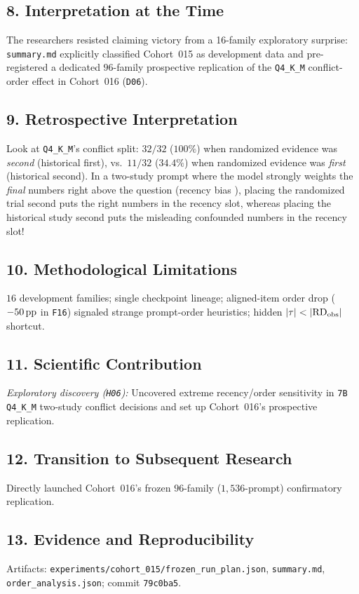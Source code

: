 \subsection*{8. Interpretation at the Time}
The researchers resisted claiming victory from a 16-family exploratory surprise: \texttt{summary.md} explicitly classified Cohort~015 as development data and pre-registered a dedicated $96$-family prospective replication of the \texttt{Q4\_K\_M} conflict-order effect in Cohort~016 (\texttt{D06}).

\subsection*{9. Retrospective Interpretation}
Look at \texttt{Q4\_K\_M}'s conflict split: $32/32$ ($100\%$) when randomized evidence was \emph{second} (historical first), vs.\ $11/32$ ($34.4\%$) when randomized evidence was \emph{first} (historical second). In a two-study prompt where the model strongly weights the \emph{final} numbers right above the question (recency bias \citep{liu2024lost}), placing the randomized trial second puts the right numbers in the recency slot, whereas placing the historical study second puts the misleading confounded numbers in the recency slot!

\subsection*{10. Methodological Limitations}
$16$ development families; single checkpoint lineage; aligned-item order drop ($-50\,\mathrm{pp}$ in \texttt{F16}) signaled strange prompt-order heuristics; hidden $|\tau| < |\mathrm{RD}_{\mathrm{obs}}|$ shortcut.

\subsection*{11. Scientific Contribution}
\emph{Exploratory discovery (\texttt{H06}):} Uncovered extreme recency/order sensitivity in \texttt{7B Q4\_K\_M} two-study conflict decisions and set up Cohort~016's prospective replication.

\subsection*{12. Transition to Subsequent Research}
Directly launched Cohort~016's frozen $96$-family ($1{,}536$-prompt) confirmatory replication.

\subsection*{13. Evidence and Reproducibility}
Artifacts: \texttt{experiments/cohort\_015/frozen\_run\_plan.json}, \texttt{summary.md}, \texttt{order\_analysis.json}; commit \texttt{79c0ba5}.

